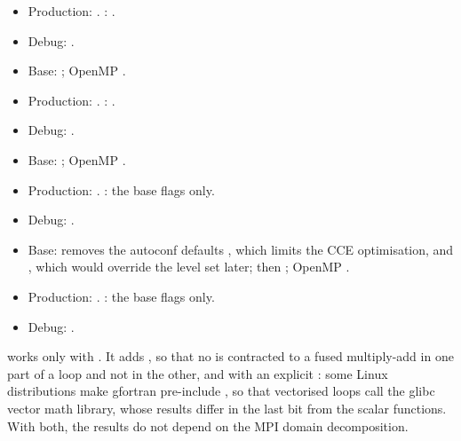 \begin{description}
\begin{itemize}
        .
      \item Production: . :
        .
      \item Debug: .
    \end{itemize}
  \item[\code{nag}] \mbox{}
    \begin{itemize}
      \item Base: ; OpenMP
        .
      \item Production: . : .
      \item Debug: .
    \end{itemize}
  \item[\code{ibm}] \mbox{}
    \begin{itemize}
      \item Base: ; OpenMP .
      \item Production: . :
        the base flags only.
      \item Debug: .
    \end{itemize}
  \item[\code{cray}] \mbox{}
    \begin{itemize}
      \item Base: removes the autoconf defaults , which limits
        the CCE optimisation, and , which would override the
        level set later; then ; OpenMP
        .
      \item Production: . : the base flags only.
      \item Debug: .
    \end{itemize}
\end{description}

 works only with . It adds
, so that no  is contracted to a fused
multiply-add in one part of a loop and not in the other, and
 with an explicit : some
Linux distributions make gfortran pre-include
, so that vectorised loops call the glibc
vector math library, whose results differ in the last bit from the scalar
functions. With both, the results do not depend on the MPI domain
decomposition.

